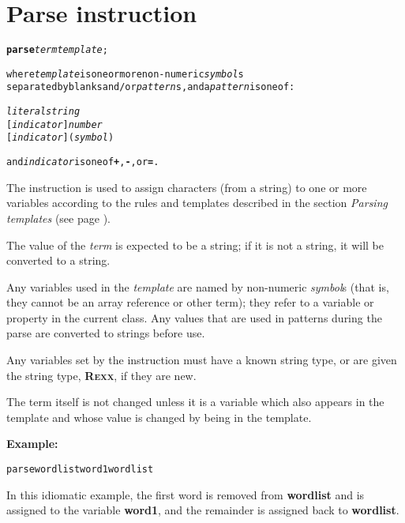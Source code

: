 \chapter{Parse instruction}\label{refparse}
\begin{shaded}
\begin{alltt}
\textbf{parse} \emph{term} \emph{template};

where \emph{template} is one or more non-numeric \emph{symbol}s
separated by blanks and/or \emph{pattern}s, and a \emph{pattern} is one of:

    \emph{literalstring}
    [\emph{indicator}] \emph{number}
    [\emph{indicator}] (\emph{symbol})

and \emph{indicator} is one of \textbf{+}, \textbf{-}, or \textbf{=}.
\end{alltt}
\end{shaded}
 The  instruction is used to assign characters (from a
string) to one or more variables according to the rules and templates
described in the section \emph{Parsing templates} (see page \pageref{refparsing}).
 
The value of the \emph{term} is expected to be a string; if it is
not a string, it will be converted to a string.
 
Any variables used in the \emph{template} are named by non-numeric
\emph{symbol}s (that is, they cannot be an array reference or other
term); they refer to a variable or property in the current class.
Any values that are used in patterns during the parse are converted to
strings before use.
 
Any variables set by the  instruction must have a known
string type, or are given the \nr{} string type, \textbf{R\textsc{exx}}, if
they are new.
 
The term itself is not changed unless it is a variable which also
appears in the template and whose value is changed by being in the
template.

\textbf{Example:}
\begin{alltt}
parse wordlist word1 wordlist
\end{alltt}
In this idiomatic example, the first word is removed
from \textbf{wordlist} and is assigned to the
variable \textbf{word1}, and the remainder is assigned back
to \textbf{wordlist}.

